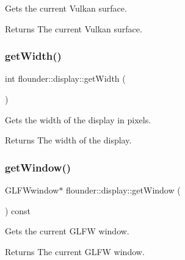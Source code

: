 Gets the current Vulkan surface. 

\begin{DoxyReturn}{Returns}
The current Vulkan surface. 
\end{DoxyReturn}
\mbox{\label{classflounder_1_1display_a4e10a13f95b11b003311f96abdc8c7ba}} 
\subsubsection{\texorpdfstring{get\+Width()}{getWidth()}}
{\footnotesize\ttfamily int flounder\+::display\+::get\+Width (\begin{DoxyParamCaption}{ }\end{DoxyParamCaption})\hspace{0.3cm}{\ttfamily [inline]}}



Gets the width of the display in pixels. 

\begin{DoxyReturn}{Returns}
The width of the display. 
\end{DoxyReturn}
\mbox{\label{classflounder_1_1display_af3e45d90f3cf5f0bdc82440790590902}} 
\subsubsection{\texorpdfstring{get\+Window()}{getWindow()}}
{\footnotesize\ttfamily G\+L\+F\+Wwindow$\ast$ flounder\+::display\+::get\+Window (\begin{DoxyParamCaption}{ }\end{DoxyParamCaption}) const\hspace{0.3cm}{\ttfamily [inline]}}



Gets the current G\+L\+FW window. 

\begin{DoxyReturn}{Returns}
The current G\+L\+FW window. 
\end{DoxyReturn}
\mbox{\label{classflounder_1_1display_ad9adfaf1f74d3b8198d60927ca196407}} 
